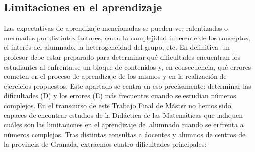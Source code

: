 \documentclass[../main.tex]{memoir}
\begin{document}
\subsection{Limitaciones en el aprendizaje}

Las expectativas de aprendizaje mencionadas se pueden ver ralentizadas o mermadas por distintos factores, como la complejidad inherente de los conceptos, el interés del alumnado, la heterogeneidad del grupo, etc. En definitiva, un profesor debe estar preparado para determinar qué dificultades encuentran los estudiantes al enfrentarse un bloque de contenidos y, en consecuencia, qué errores cometen en el proceso de aprendizaje de los mismos y en la realización de ejercicios propuestos. Este apartado se centra en eso precisamente: determinar las dificultades (D) y los errores (E) más frecuentes cuando se estudian números complejos. En el transcurso de este Trabajo Final de Máster no hemos sido capaces de encontrar estudios de la Didáctica de las Matemáticas que indiquen cuáles son las limitaciones en el aprendizaje del alumnado cuando se enfrenta a números complejos. Tras distintas consultas a docentes y alumnos de centros de la provincia de Granada, extraemos cuatro dificultades principales:
\end{document}
